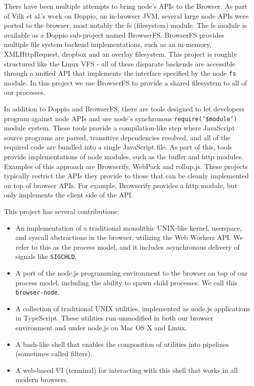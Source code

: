 \documentclass{acm_proc_article-sp}
\begin{document}
There have been multiple attempts to bring node's APIs to the Browser.
As part of Vilk et al.'s work on Doppio, an in-browser JVM, several
large node APIs were ported to the browser, most notably the fs
(filesystem) module.  The fs module is available as a Doppio
sub-project named BrowserFS.  BrowserFS provides multiple file system
backend implementations, such as an in-memory, XMLHttpRequest, dropbox
and an overlay filesystem.  This project is roughly structured like
the Linux VFS - all of these disparate backends are accessible through
a unified API that implements the interface specified by the node
\texttt{fs} module.  In this project we use BrowserFS to provide a
shared filesystem to all of our processes.

In addition to Doppio and BrowserFS, there are tools designed to let
developers program against node APIs and use node's synchronous
\texttt{require('\$module')} module system.  These tools provide a
compilation-like step where JavaScript source programs are parsed,
transitive dependencies resolved, and all of the required code are
bundled into a single JavaScript file.  As part of this, tools provide
implementations of node modules, such as the buffer and http modules.
Examples of this approach are Browserify, WebPack and rollup.js.
These projects typically restrict the APIs they provide to those that
can be cleanly implemented on top of browser APIs.  For example,
Browserify provides a http module, but only implements the client side
of the API.

This project has several contributions:

\begin{itemize}
  \item An implementation of a traditional monolithic UNIX-like
    kernel, userspace, and syscall abstractions in the browser,
    utilizing the Web Workers API.  We refer to this as the process
    model, and it includes asynchronous delivery of signals like
    \texttt{SIGCHLD}.
  \item A port of the node.js programming environment to the browser
    on top of our process model, including the ability to spawn child
    processes.  We call this \texttt{browser-node}.
  \item A collection of traditional UNIX utilities, implemented as
    node.js applications in TypeScript.  These utilities run
    unmodified in both our browser environment and under node.js on
    Mac OS X and Linux.
  \item A bash-like shell that enables the composition of utilities
    into pipelines (sometimes called filters).
  \item A web-based UI (terminal) for interacting with this shell that
    works in all modern browsers.
\end{itemize}
\end{document}
